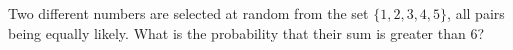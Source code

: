 Two different numbers are selected at random from the set $\{1,2,3,4,5\}$, all pairs being equally likely. What is the probability that their sum is greater than $6$?
